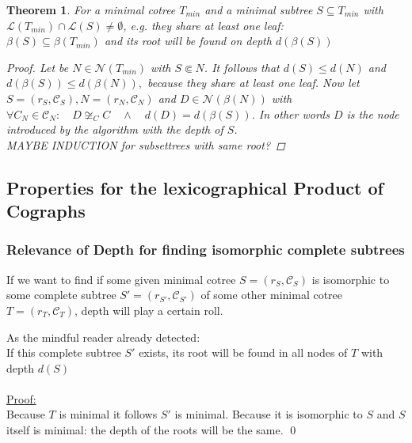 \documentclass[a4paper,12pt]{article}
\newtheorem{theorem}{Theorem}[section]
\theoremstyle{definition}
\begin{document}
	\begin{theorem}
		For a minimal cotree $T_{min}$ and a minimal subtree $S\subseteq T_{min}$ with $\mathcal{L}(T_{min})\cap \mathcal{L}(S) \not = \emptyset$, e.g. they share at least one leaf:\\
		$\beta (S)\subseteq \beta(T_{min})$ and its root will be found on depth $d(\beta (S))$
		\begin{proof}
			Let be $N\in \mathcal{N}(T_{min})$ with $S\Subset N$. It follows that $d(S) \leq d(N)$ and $d(\beta (S)) \leq d(\beta (N)),$ because they share at least one leaf. Now let $S=(r_S, \mathcal{C}_S), N=(r_N, \mathcal{C}_N)$ and  $D\in \mathcal{N}(\beta(N))$ with $\forall C_N \in \mathcal{C}_N:\quad D\not \cong_C C\quad \land\quad  d(D) = d(\beta(S))$. In other words $D$ is the node introduced by the algorithm with the depth of $S$.\\
			
			MAYBE INDUCTION for subsettrees with same root?
		\end{proof}
	\end{theorem}
	\subsection{Properties for the lexicographical Product of Cographs}

		\subsubsection{Relevance of Depth for finding isomorphic complete subtrees}
		
			If we want to find if some given minimal cotree $S=(r_S, \mathcal{C}_S)$ is isomorphic to some  complete subtree $S'=(r_{S'},\mathcal{C}_{S'})$ of some other minimal cotree $T=(r_T, \mathcal{C}_T)$, depth will play a certain roll.
			\begin{center}
			\end{center}
			As the mindful reader already detected:\\
			If this complete subtree $S'$ exists, its root will be found in all nodes of $T$ with depth $d(S)$\\\\
			\underline{Proof:}\\ Because $T$ is minimal it follows $S'$ is minimal. Because it is isomorphic to $S$ and $S$ itself is minimal: the depth of the roots will be the same. \qed
\end{document}
